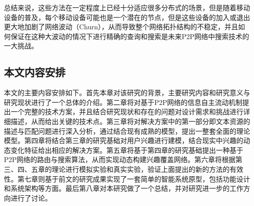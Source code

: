 总结来说，这些方法在一定程度上已经十分适应很多分布式的场景，但是随着移动设备的普及，每个移动设备可能也是一个潜在的节点，但是这些设备的加入或退出更大地加剧了网络波动（Churn），从而导致整个网络拓扑结构的不稳定，并且如何保证在这种大波动的情况下进行精确的查询和搜索是未来P2P网络中搜索技术的一大挑战。

\subsection{本文内容安排}
本文的主要内容安排如下。首先本章对该研究的背景，主要研究内容和研究意义与研究现状进行了一个总体的介绍。第二章将对基于P2P网络的信息自主流动机制提出一个完整的技术方案，并且结合研究现状和存在的问题对设计需求和挑战进行详细描述，从而给出关键的技术点。第三章将对解决方案中的第一部分即文本资源的描述与匹配问题进行深入分析，通过结合现有成熟的模型，提出一整套全面的理论模型。第四章将结合第三章的研究基础对用户兴趣进行建模，结合现实中兴趣的动态变化特征给出相应的解决方案。第五章将基于第四章的研究基础提出一种基于P2P网络的路由与搜索算法，从而实现动态构建兴趣覆盖网络。第六章将根据第三、四、五章的理论进行模拟实验和真实实验，验证上面提出的新的方法的有效性。第七章则基于前文的研究成果实现了一套简单的智能系统原型，包括功能设计和系统架构等方面。最后第八章对本研究做了一个总结，并对研究进一步的工作方向进行了讨论。

